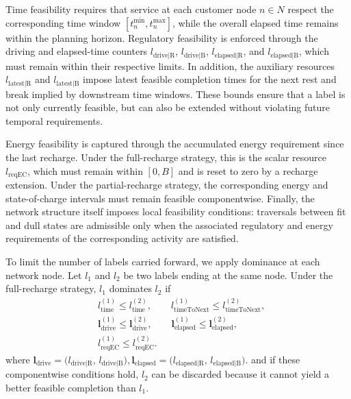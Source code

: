 \documentclass[3p,11pt,authoryear]{elsarticle}  %
\begin{document}
Time feasibility requires that service at each customer node \(n\in N\) respect the corresponding time window \([t_n^{\min},t_n^{\max}]\), while the overall elapsed time remains within the planning horizon. Regulatory feasibility is enforced through the driving and elapsed-time counters \(l_{\text{drive|R}}\), \(l_{\text{drive|B}}\), \(l_{\text{elapsed|R}}\), and \(l_{\text{elapsed|B}}\), which must remain within their respective limits. In addition, the auxiliary resources \(l_{\text{latest|R}}\) and \(l_{\text{latest|B}}\) impose latest feasible completion times for the next rest and break implied by downstream time windows. These bounds ensure that a label is not only currently feasible, but can also be extended without violating future temporal requirements.

Energy feasibility is captured through the accumulated energy requirement since the last recharge. Under the full-recharge strategy, this is the scalar resource \(l_{\text{reqEC}}\), which must remain within \([0,B]\) and is reset to zero by a recharge extension. Under the partial-recharge strategy, the corresponding energy and state-of-charge intervals must remain feasible componentwise. Finally, the network structure itself imposes local feasibility conditions: traversals between fit and dull states are admissible only when the associated regulatory and energy requirements of the corresponding activity are satisfied.

To limit the number of labels carried forward, we apply dominance at each network node. Let \(l_1\) and \(l_2\) be two labels ending at the same node. Under the full-recharge strategy, \(l_1\) dominates \(l_2\) if
\[
\begin{aligned}
&l_{\text{time}}^{(1)} \le l_{\text{time}}^{(2)},\qquad
l_{\text{timeToNext}}^{(1)} \le l_{\text{timeToNext}}^{(2)},\\
&\mathbf{l}_{\text{drive}}^{(1)} \le \mathbf{l}_{\text{drive}}^{(2)},\qquad
\mathbf{l}_{\text{elapsed}}^{(1)} \le \mathbf{l}_{\text{elapsed}}^{(2)},\\
&l_{\text{reqEC}}^{(1)} \le l_{\text{reqEC}}^{(2)}.
\end{aligned}
\]
where 
\(
\mathbf{l}_{\text{drive}}
=
\bigl(l_{\text{drive|R}},\,l_{\text{drive|B}}\bigr),
\mathbf{l}_{\text{elapsed}}
=
\bigl(l_{\text{elapsed|R}},\,l_{\text{elapsed|B}}\bigr).
\) and if these componentwise conditions hold, \(l_2\) can be discarded because it cannot yield a better feasible completion than \(l_1\).
\end{document}
